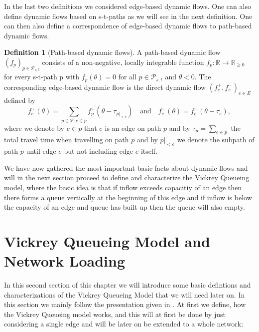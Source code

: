 \documentclass[reqno,openany]{amsbook}
\theoremstyle{definition}
\newtheorem{definition}{Definition}[chapter]
\theoremstyle{plain}
\begin{document}
In the last two definitions we considered edge-based dynamic flows. One can also define dynamic flows based on s-t-paths as we will see in the next definition. One can then also define a correspondence of edge-based dynamic flows to path-based dynamic flows.

\begin{definition}[Path-based dynamic flows]
A path-based dynamic flow $(f_p)_{p \in \mathcal{P}_{s,t}}$ consists of a non-negative, locally integrable function $f_p: \mathbb{R} \to \mathbb{R}_{\geq 0}$ for every s-t-path p with $f_p(\theta) = 0$ for all $p \in \mathcal{P}_{s,t}$ and $\theta < 0$. The corresponding edge-based dynamic flow is the direct dynamic flow $(f_e^+, f_e^-)_{e \in E}$ defined by 
\[ f_e^+(\theta) = \sum_{p \in \mathcal{P}: e \in p} f_p^+(\theta - \tau_{p\vert_{<e}}) \quad \text{and} \quad f_e^-(\theta) = f_e^+(\theta - \tau_e),\]
where we denote by $e \in p$ that $e$ is an edge on path $p$ and by $\tau_p = \sum_{e \in p}$ the total travel time when travelling on path $p$ and by $p\vert_{<e}$ we denote the subpath of path $p$ until edge $e$ but not including edge $e$ itself.
\end{definition}

We have now gathered the most important basic facts about dynamic flows and will in the next section proceed to define and characterize the Vickrey Queueing model, where the basic idea is that if inflow exceeds capacitiy of an edge then there forms a queue vertically at the beginning of this edge and if inflow is below the capacity of an edge and queue has built up then the queue will also empty.

\section{Vickrey Queueing Model and Network Loading}
In this second section of this chapter we will introduce some basic defintions and characterizations of the Vickrey Queueing Model that we will need later on. In this section we mainly follow the presentation given in \cite[Chapter 3]{GRA1}. At first we define, how the Vickrey Queueing model works, and this will at first be done by just considering a single edge and will be later on be extended to a whole network:
\end{document}
